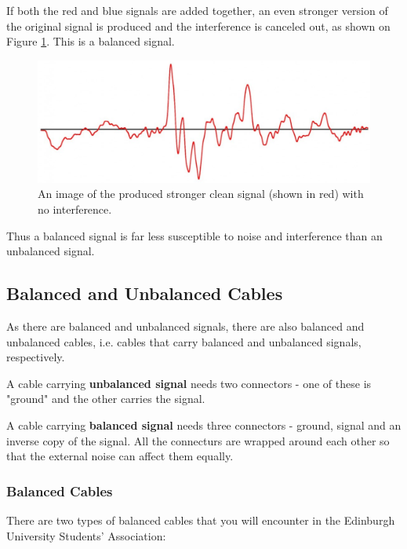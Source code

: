\documentclass[14pt,twocolumn]{extarticle} %
\begin{document}
If both the red and blue signals are added together, an even stronger version of the original signal is produced and the interference is canceled out, as shown on Figure \ref{fig:clean-signal}. This is a balanced signal. 

\begin{figure}[h]
\begin{center}

\includegraphics[width=18cm]{clean-signal.png}
\caption{An image of the produced stronger clean signal (shown in red) with no interference.}
\label{fig:clean-signal}

\end{center}
\end{figure}

Thus a balanced signal is far less susceptible to noise and interference than an unbalanced signal.

\subsection{Balanced and Unbalanced Cables}
\label{balanced-unbalanced-cables}
As there are balanced and unbalanced signals, there are also balanced and unbalanced cables, i.e. cables that carry balanced and unbalanced signals, respectively.

A cable carrying \textbf{unbalanced signal} needs two connectors - one of these is "ground" and the other carries the signal.

A cable carrying \textbf{balanced signal} needs three connectors - ground, signal and an inverse copy of the signal. All the connecturs are wrapped around each other so that the external noise can affect them equally. 


\subsubsection{Balanced Cables}
\label{balanced-cables} 
There are two types of balanced cables that you will encounter in the Edinburgh University Students' Association:
\end{document}
